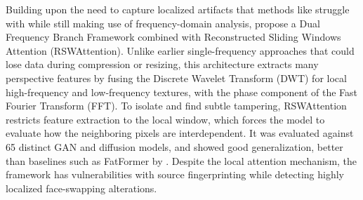 Building upon the need to capture localized artifacts that methods
like \citet{manisha2025camera} struggle with while still making use of
frequency-domain analysis, \citet{yan2026dff} propose a Dual Frequency Branch
Framework combined with Reconstructed Sliding Windows Attention
(RSWAttention). Unlike earlier single-frequency approaches that could
lose data during compression or resizing, this architecture extracts
many perspective features by fusing the Discrete Wavelet Transform
(DWT) for local high-frequency and low-frequency textures, with the
phase component of the Fast Fourier Transform (FFT). To isolate and
find subtle tampering, RSWAttention restricts feature extraction to
the local window, which forces the model to evaluate how the
neighboring pixels are interdependent. It was evaluated against 65
distinct GAN and diffusion models, and showed good generalization,
better than baselines such as FatFormer by \citet{liu2023fatformer}. Despite the
local attention mechanism, the framework has vulnerabilities with source
fingerprinting while detecting highly localized face-swapping alterations.
